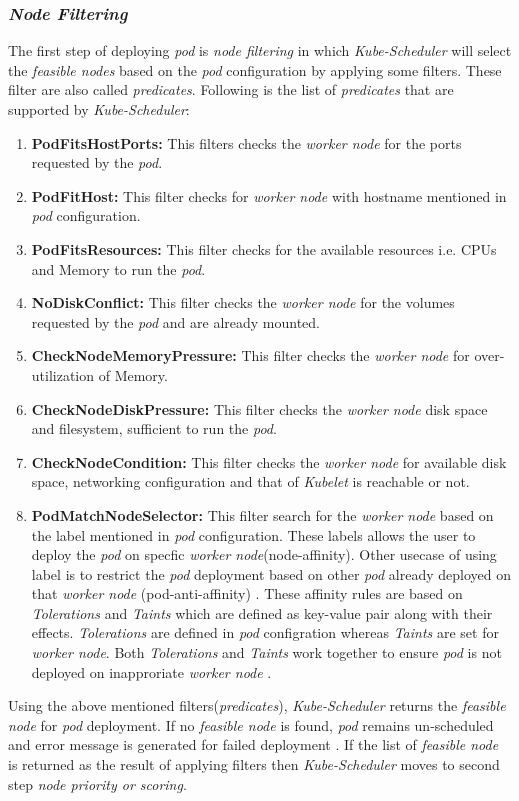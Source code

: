 \subsubsection{\emph{Node Filtering}}
\label{sec:node-filter}
The first step of deploying \emph{pod} is \emph{node filtering} in which \emph{Kube-Scheduler} will select the \emph{feasible nodes} based on the \emph{pod} configuration by applying some filters. These filter are also called \emph{predicates}. Following is the list of \emph{predicates} that are supported by \emph{Kube-Scheduler}\cite{k8s}:
\begin{enumerate}
  \item \textbf{PodFitsHostPorts:} This filters checks the \emph{worker node} for the ports requested by the \emph{pod}.
  \item \textbf{PodFitHost:} This filter checks for \emph{worker node} with hostname mentioned in \emph{pod} configuration.
  \item \textbf{PodFitsResources:} This filter checks for the available resources i.e. CPUs and Memory to run the \emph{pod}.
  \item \textbf{NoDiskConflict:} This filter checks the \emph{worker node} for the volumes requested by the \emph{pod} and are already mounted.
  \item \textbf{CheckNodeMemoryPressure:} This filter checks the \emph{worker node} for over-utilization of Memory.
  \item \textbf{CheckNodeDiskPressure:} This filter checks the \emph{worker node} disk space and filesystem, sufficient to run the \emph{pod}.
  \item \textbf{CheckNodeCondition:} This filter checks the \emph{worker node} for available disk space, networking configuration and that of \emph{Kubelet} is reachable or not.
  \item \textbf{PodMatchNodeSelector:} This filter search for the \emph{worker node} based on the label mentioned in \emph{pod} configuration. These labels allows the user to deploy the \emph{pod} on specfic \emph{worker node}(node-affinity)\cite{Santos2019}. Other usecase of using label is to restrict the \emph{pod} deployment based on other \emph{pod} already deployed on that \emph{worker node} (pod-anti-affinity) \cite{Santos2019}. These affinity rules are based on \emph{Tolerations} and \emph{Taints} which are defined as key-value pair along with their effects. \emph{Tolerations} are defined in \emph{pod} configration whereas \emph{Taints} are set for \emph{worker node}. Both \emph{Tolerations} and \emph{Taints} work together to ensure \emph{pod} is not deployed on inapproriate \emph{worker node} \cite{k8s}.
\end{enumerate}
Using the above mentioned filters(\emph{predicates}), \emph{Kube-Scheduler} returns the \emph{feasible node} for \emph{pod} deployment. If no \emph{feasible node} is found, \emph{pod} remains un-scheduled and error message is generated for failed deployment \cite{Santos2019}. If the list of \emph{feasible node} is returned as the result of applying filters then \emph{Kube-Scheduler} moves to second step \emph{node priority or scoring}.

